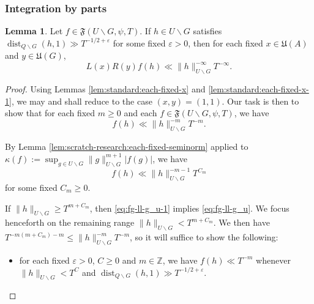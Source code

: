 \documentclass[reqno]{amsart}
\def\eps{\varepsilon}
\DeclareMathOperator{\dist}{dist}
\theoremstyle{plain} \newtheorem{theorem} {Theorem}
\theoremstyle{definition} \newtheorem{definition} [theorem] {Definition}
\theoremstyle{itplain} %
\newtheorem{lemma}[theorem]{Lemma}
\numberwithin{equation}{section}
\numberwithin{theorem}{section}
\renewcommand{\geq}{\geqslant}
\renewcommand{\leq}{\leqslant}
\begin{document}
\subsubsection{Integration by parts}\label{sec:integration-parts}


\begin{lemma}\label{lem:scratch-research:let-h-in}
  Let $f \in \mathfrak{F}(U \backslash G, \psi, T)$.  If $h \in U \backslash G$ satisfies $\dist_{Q \backslash G}(h,1) \gg T^{-1/2+\eps}$ for some fixed $\eps > 0$, then for each fixed $x \in \mathfrak{U}(A)$ and $y \in \mathfrak{U}(G)$,
  \begin{equation*}
    L(x) R(y) f(h) \ll
    \|h\|_{U \backslash G}^{-\infty}
    T^{-\infty}.
  \end{equation*}
\end{lemma}
\begin{proof}
  Using Lemmas \ref{lem:standard:each-fixed-x} and \ref{lem:standard:each-fixed-x-1}, we may and shall reduce to the case $(x,y) = (1,1)$.  Our task is then to show that for each fixed $m \geq 0$ and each $f \in \mathfrak{F}(U \backslash G, \psi, T)$, we have
  \begin{equation}\label{eq:fg-ll-g_u}
    f(h) \ll \|h\|_{U \backslash G}^{-m} T^{-m}.
  \end{equation}

  By Lemma \ref{lem:scratch-research:each-fixed-seminorm} applied to $\kappa(f) := \sup_{g \in U \backslash G} \|g\|_{U \backslash G}^{m+1} |f(g)|$, we have
  \begin{equation}\label{eq:fg-ll-g_u-1}
    f(h) \ll \|h\|_{U \backslash G}^{-m - 1} T^{C_m}
  \end{equation}
  for some fixed $C_m \geq 0$.

  If $\|h\|_{U \backslash G} \geq T^{m + C_m}$, then \eqref{eq:fg-ll-g_u-1} implies \eqref{eq:fg-ll-g_u}.  We focus henceforth on the remaining range $\|h\|_{U \backslash G} < T^{m + C_m}$.  We then have $T^{-m(m+ C_m) - m} \leq \|h\|_{U \backslash G}^{-m} T^{-m}$, so it will suffice to show the following:
  \begin{itemize}
  \item for each fixed $\eps > 0$, $C \geq 0$ and $m \in \mathbb{Z}$, we have $f(h) \ll T^{-m}$ whenever $\|h\|_{U \backslash G} < T^{C}$ and $\dist_{Q \backslash G}(h,1) \gg T^{-1/2+\eps}$.
  \end{itemize}


\end{proof}
\end{document}
